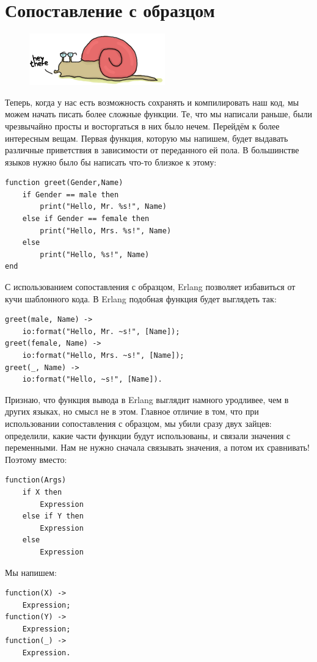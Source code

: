 \documentclass[a4paper,12pt]{report}
\begin{document}
\section{Сопоставление с образцом}
\begin{figure}
    \includegraphics[width=1\linewidth]{snail.png}
\end{figure}
Теперь, когда у нас есть возможность сохранять и компилировать наш код, мы можем начать писать более сложные функции. Те, что мы написали раньше, были чрезвычайно просты и восторгаться в них было нечем. Перейдём к более интересным вещам. Первая функция, которую мы напишем, будет выдавать различные приветствия в зависимости от переданного ей пола. В большинстве языков нужно было бы написать что\--то близкое к этому:
\begin{lstlisting}[style=erlang]
function greet(Gender,Name)
    if Gender == male then
        print("Hello, Mr. %s!", Name)
    else if Gender == female then
        print("Hello, Mrs. %s!", Name)
    else
        print("Hello, %s!", Name)
end
\end{lstlisting}

С использованием сопоставления с образцом, Erlang позволяет избавиться от кучи шаблонного кода. В Erlang подобная функция будет выглядеть так:
\begin{lstlisting}[style=erlang]
greet(male, Name) ->
    io:format("Hello, Mr. ~s!", [Name]);
greet(female, Name) ->
    io:format("Hello, Mrs. ~s!", [Name]);
greet(_, Name) ->
    io:format("Hello, ~s!", [Name]).
\end{lstlisting}

Признаю, что функция вывода в Erlang выглядит намного уродливее, чем в других языках, но смысл не в этом. Главное отличие в том, что при использовании сопоставления с образцом, мы убили сразу двух зайцев: определили, какие части функции будут использованы, и связали значения с переменными. Нам не нужно сначала связывать значения, а потом их сравнивать! Поэтому вместо:
\begin{lstlisting}[style=erlang]
function(Args)
    if X then
        Expression
    else if Y then
        Expression
    else
        Expression
\end{lstlisting}
Мы напишем:
\begin{lstlisting}[style=erlang]
function(X) ->
    Expression;
function(Y) ->
    Expression;
function(_) ->
    Expression.
\end{lstlisting}
\end{document}
